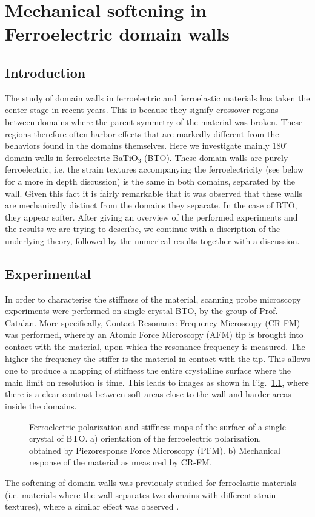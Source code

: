 \chapter{Mechanical softening in Ferroelectric domain walls}


\section{Introduction}
The study of domain walls in ferroelectric and ferroelastic materials has taken the center stage in recent years. This is because they signify crossover regions between domains where the parent symmetry of the material was broken. These regions therefore often harbor effects that are markedly different from the behaviors found in the domains themselves. Here we investigate mainly 180$^\circ$ domain walls in ferroelectric BaTiO$_3$ (BTO).
These domain walls are purely ferroelectric, i.e. the strain textures accompanying the ferroelectricity (see below for a more in depth discussion) is the same in both domains, separated by the wall. Given this fact it is fairly remarkable that it was observed that these walls are mechanically distinct from the domains they separate. In the case of BTO, they appear softer.
After giving an overview of the performed experiments and the results we are trying to describe, we continue with a discription of the underlying theory, followed by the numerical results together with a discussion.


\section{Experimental}
In order to characterise the stiffness of the material, scanning probe microscopy experiments were performed on single crystal BTO, by the group of Prof. Catalan. More specifically, Contact Resonance Frequency Microscopy (CR-FM) was performed, whereby an Atomic Force Microscopy (AFM) tip is brought into contact with the material, upon which the resonance frequency is measured. The higher the frequency the stiffer is the material in contact with the tip. This allows one to produce a mapping of stiffness the entire crystalline surface where the main limit on resolution is time. This leads to images as shown in Fig.~\ref{fig:BTO_experiment}, where there is a clear contrast between soft areas close to the wall and harder areas inside the domains.
\begin{figure}
	\caption{\label{fig:BTO_experiment} Ferroelectric polarization and stiffness maps of the surface of a single crystal of BTO. a) orientation of the ferroelectric polarization, obtained by Piezoresponse Force Microscopy (PFM). b) Mechanical response of the material as measured by CR-FM.}
\end{figure}
The softening of domain walls was previously studied for ferroelastic materials (i.e. materials where the wall separates two domains with different strain textures), where a similar effect was observed \cite{Lee2003}.


